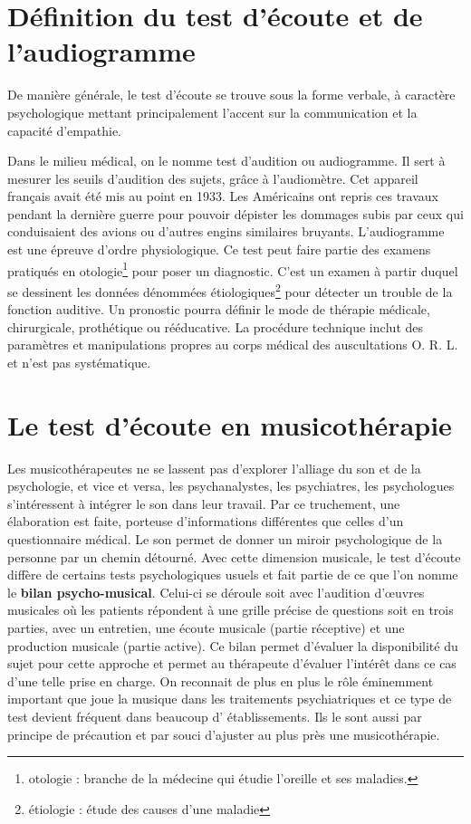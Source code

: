 \section{Définition du test d'écoute et de l'audiogramme}

De manière générale, le test d'écoute se trouve sous la forme verbale,
à caractère  
psychologique mettant principalement l'accent sur la communication
et la capacité d'empathie.

Dans le milieu médical, on le nomme test d'audition ou audiogramme. Il
sert à mesurer les seuils d'audition des sujets, grâce à l'audiomètre. Cet 
appareil français avait été mis au point en 1933. Les Américains
ont repris ces travaux pendant la dernière guerre pour pouvoir dépister
les dommages subis par ceux qui conduisaient des avions ou d'autres
engins similaires bruyants.
  L'audiogramme est une épreuve d'ordre physiologique. Ce test peut faire partie des examens  pratiqués en otologie\footnote{otologie : branche de la médecine
  	qui étudie l'oreille et ses maladies.} pour poser un diagnostic. 
   C'est un examen à partir duquel se
  dessinent les données dénommées étiologiques\footnote{étiologie : étude des causes
  	d'une maladie} pour détecter un trouble de la fonction auditive. Un pronostic pourra définir le mode de thérapie
médicale, chirurgicale, prothétique ou rééducative. La procédure
technique inclut des paramètres et manipulations propres au corps
médical des auscultations O. R. L. et  n'est pas systématique.






\section{Le test d'écoute en musicothérapie}

Les musicothérapeutes ne se lassent pas d'explorer l'alliage du son
 et de la psychologie, et vice
 et versa, les psychanalystes, les psychiatres, les psychologues
 s'intéressent à intégrer le son dans leur travail. Par ce truchement,
 une élaboration est faite, porteuse d'informations différentes que
 celles d'un questionnaire médical. Le son permet de donner un miroir
 psychologique de la personne par un chemin détourné. Avec cette dimension
 musicale, le test d'écoute diffère de certains tests psychologiques usuels
 et fait partie de ce que l'on nomme le \textbf{ bilan
   psycho-musical}. Celui-ci se déroule soit avec l'audition d'\oe uvres
 musicales où les patients répondent à une grille précise de questions
  soit en trois parties, avec un entretien,
 une écoute musicale (partie réceptive) et une production musicale
 (partie active).
Ce bilan permet d'évaluer la disponibilité du sujet pour cette
approche et permet au thérapeute d'évaluer l'intérêt dans ce cas
d'une telle prise en charge.
 On reconnait de plus en plus le rôle éminemment important que joue la musique
 dans les traitements psychiatriques et ce type de test devient
 fréquent dans beaucoup d' établissements. Ils le sont aussi par principe de précaution et
 par souci d'ajuster au plus près une
 musicothérapie.



